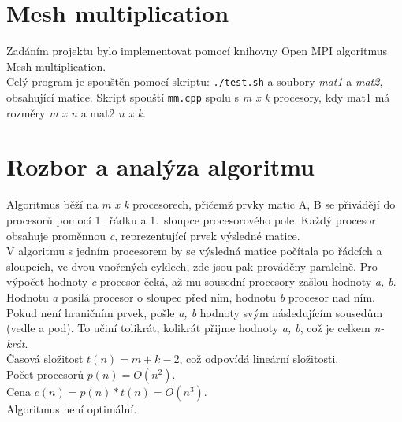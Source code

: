 \documentclass[11pt]{article}
\begin{document}
\section{Mesh multiplication}
Zadáním projektu bylo implementovat pomocí knihovny Open MPI algoritmus Mesh multiplication.\\ 
Celý program je spouštěn pomocí skriptu: \texttt{./test.sh} a soubory 
\textit{mat1} a \textit{mat2}, obsahující matice. Skript spouští \texttt{mm.cpp}
spolu s \textit{m x k} procesory, kdy mat1 má rozměry \textit{m x n} a mat2 \textit{n x k}.

\section{Rozbor a analýza algoritmu}
Algoritmus běží na \textit{m x k} procesorech, přičemž prvky matic A, B se přivádějí do 
procesorů pomocí 1.\ řádku a 1.\ sloupce procesorového pole. Každý procesor obsahuje proměnnou \textit{c},
reprezentující prvek výsledné matice.\\
V algoritmu s jedním procesorem by se výsledná matice počítala po řádcích a sloupcích,
ve dvou vnořených cyklech, zde jsou pak prováděny paralelně.
Pro výpočet hodnoty \textit{c} procesor čeká, až mu sousední procesory zašlou hodnoty
\textit{a, b}. Hodnotu \textit{a} posílá procesor o sloupec před ním, hodnotu \textit{b} procesor nad ním.
Pokud není hraničním prvek, pošle \textit{a, b} hodnoty svým následujícím sousedům (vedle a pod).
To učiní tolikrát, kolikrát přijme hodnoty \textit{a, b}, což je celkem \textit{n-krát}.\\
Časová složitost $t(n) = m + k - 2$, což odpovídá lineární složitosti.\\
Počet procesorů $p(n) = O(n^2)$. \\
Cena $c(n) = p(n) * t(n) = O(n^3)$.\\
Algoritmus není optimální.
\end{document}
